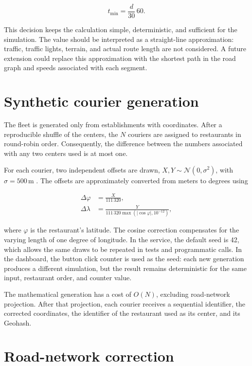 \documentclass[12pt,a4paper]{article}
\begin{document}
\begin{equation}
t_{\mathrm{min}} = \frac{d}{30}\,60.
\end{equation}

This decision keeps the calculation simple, deterministic, and sufficient for
the simulation. The value should be interpreted as a straight-line
approximation: traffic, traffic lights, terrain, and actual route length are
not considered. A future extension could replace this approximation with the
shortest path in the road graph and speeds associated with each segment.

\section{Synthetic courier generation}

The fleet is generated only from establishments with coordinates. After a
reproducible shuffle of the centers, the $N$ couriers are assigned to
restaurants in round-robin order. Consequently, the difference between the
numbers associated with any two centers used is at most one.

For each courier, two independent offsets are drawn,
$X,Y \sim \mathcal{N}(0,\sigma^2)$, with $\sigma=500\,\mathrm{m}$
\cite{normal-nist}. The offsets are approximately converted from meters to
degrees using

\begin{align}
\Delta\varphi &=
    \frac{X}{111\,320}, \\
\Delta\lambda &=
    \frac{Y}{111\,320\max\left(|\cos\varphi|,10^{-12}\right)},
\end{align}

where $\varphi$ is the restaurant's latitude. The cosine correction compensates
for the varying length of one degree of longitude. In the service, the default
seed is 42, which allows the same draws to be repeated in tests and
programmatic calls. In the dashboard, the button click counter is used as the
seed: each new generation produces a different simulation, but the result
remains deterministic for the same input, restaurant order, and counter value.

The mathematical generation has a cost of $O(N)$, excluding road-network
projection. After that projection, each courier receives a sequential
identifier, the corrected coordinates, the identifier of the restaurant used
as its center, and its Geohash.

\section{Road-network correction}
\end{document}
